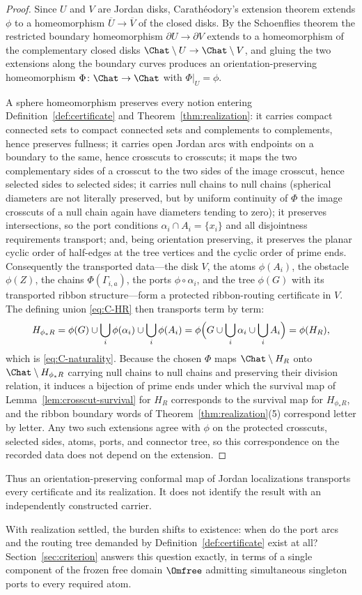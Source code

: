 \begin{proof}
Since $U$ and $V$ are Jordan disks, Carath\'eodory's extension theorem
\cite{Pom92} extends $\phi$ to a homeomorphism
$\overline U\to\overline V$ of the closed disks.  By the Schoenflies
theorem the restricted boundary homeomorphism
$\partial U\to\partial V$ extends to a homeomorphism of the complementary
closed disks $\Chat\setminus U\to\Chat\setminus V$, and gluing the two
extensions along the boundary curves produces an orientation-preserving
homeomorphism $\Phi\colon\Chat\to\Chat$ with $\Phi|_U=\phi$.

A sphere homeomorphism preserves every notion entering
Definition~\ref{def:certificate} and Theorem~\ref{thm:realization}: it
carries compact connected sets to compact connected sets and complements
to complements, hence preserves fullness; it carries open Jordan arcs
with endpoints on a boundary to the same, hence crosscuts to crosscuts;
it maps the two complementary sides of a crosscut to the two sides of the
image crosscut, hence selected sides to selected sides; it carries null
chains to null chains (spherical diameters are not literally preserved,
but by uniform continuity of $\Phi$ the image crosscuts of a null chain
again have diameters tending to zero); it preserves intersections, so the
port conditions $\alpha_i\cap A_i=\{x_i\}$ and all disjointness
requirements transport; and, being orientation preserving, it preserves
the planar cyclic order of half-edges at the tree vertices and the cyclic
order of prime ends.  Consequently the transported data---the disk $V$,
the atoms $\phi(A_i)$, the obstacle $\phi(Z)$, the chains
$\Phi(\Gamma_{i,a})$, the ports $\phi\circ\alpha_i$, and the tree
$\phi(G)$ with its transported ribbon structure---form a protected
ribbon-routing certificate in $V$.  The defining union \eqref{eq:C-HR}
then transports term by term:
\[
H_{\phi_*R}
=\phi(G)\cup\bigcup_i\phi(\alpha_i)\cup\bigcup_i\phi(A_i)
=\phi\Bigl(G\cup\bigcup_i\alpha_i\cup\bigcup_iA_i\Bigr)
=\phi(H_R),
\]
which is \eqref{eq:C-naturality}.  Because the chosen $\Phi$ maps
$\Chat\setminus H_R$ onto $\Chat\setminus H_{\phi_*R}$ carrying null
chains to null chains and preserving their division relation, it induces
a bijection of prime ends under which the survival map of
Lemma~\ref{lem:crosscut-survival} for $H_R$ corresponds to the survival
map for $H_{\phi_*R}$, and the ribbon boundary words of
Theorem~\ref{thm:realization}(5) correspond letter by letter.  Any two
such extensions agree with $\phi$ on the protected crosscuts, selected
sides, atoms, ports, and connector tree, so this correspondence on the
recorded data does not depend on the extension.
\end{proof}

Thus an orientation-preserving conformal map of Jordan localizations
transports every certificate and its realization.  It does not identify
the result with an independently constructed carrier.

With realization settled, the burden shifts to existence: when do the
port arcs and the routing tree demanded by
Definition~\ref{def:certificate} exist at all?
Section~\ref{sec:criterion} answers this question exactly, in terms of a
single component of the frozen free domain $\Omfree$ admitting
simultaneous singleton ports to every required atom.
